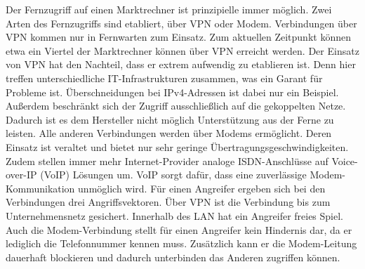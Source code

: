 \documentclass[11pt,a4paper]{report}
\begin{document}
Der Fernzugriff auf einen Marktrechner ist prinzipielle immer möglich. Zwei Arten des Fernzugriffs sind etabliert, über VPN oder Modem. Verbindungen über VPN kommen nur in Fernwarten zum Einsatz. Zum aktuellen Zeitpunkt können etwa ein Viertel der Marktrechner können über VPN erreicht werden. Der Einsatz von VPN hat den Nachteil, dass er extrem aufwendig zu etablieren ist. Denn hier treffen unterschiedliche IT-Infrastrukturen zusammen, was ein Garant für Probleme ist. Überschneidungen bei IPv4-Adressen ist dabei nur ein Beispiel. Außerdem beschränkt sich der Zugriff ausschließlich auf die gekoppelten Netze. Dadurch ist es dem Hersteller nicht möglich Unterstützung aus der Ferne zu leisten. Alle anderen Verbindungen werden über Modems ermöglicht. Deren Einsatz ist veraltet und bietet nur sehr geringe Übertragungsgeschwindigkeiten. Zudem stellen immer mehr Internet-Provider analoge ISDN-Anschlüsse auf Voice-over-IP (VoIP) Lösungen um. VoIP sorgt dafür, dass eine zuverlässige Modem-Kommunikation unmöglich wird. Für einen Angreifer ergeben sich bei den Verbindungen drei Angriffsvektoren. Über VPN ist die Verbindung bis zum Unternehmensnetz gesichert. Innerhalb des LAN hat ein Angreifer freies Spiel. Auch die Modem-Verbindung stellt für einen Angreifer kein Hindernis dar, da er lediglich die Telefonnummer kennen muss. Zusätzlich kann er die Modem-Leitung dauerhaft blockieren und dadurch unterbinden das Anderen zugriffen können.

\end{document}
